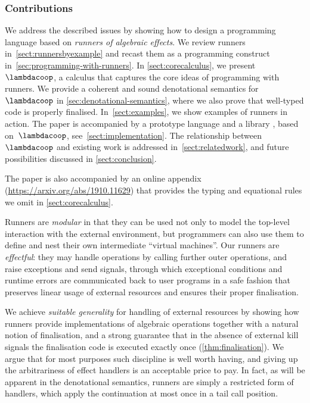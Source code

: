 \subsubsection*{Contributions}

We address the described issues by showing how to design a programming
language based on \emph{runners of algebraic effects}. We
review runners in~\cref{sect:runnersbyexample} and recast them as
a programming construct in~\cref{sec:programming-with-runners}.
%
In \cref{sect:corecalculus}, we present $\lambdacoop$, a calculus that captures the core ideas of programming with
runners. 
%
We provide a coherent and sound denotational semantics for $\lambdacoop$ in \cref{sec:denotational-semantics}, where we also prove that well-typed code is properly finalised.
%
In~\cref{sect:examples}, we show examples of runners in action. The paper is accompanied by a
prototype language  and a  library , based on~$\lambdacoop$, see~\cref{sect:implementation}. The relationship between $\lambdacoop$ and existing work is addressed in~\cref{sect:relatedwork}, and future possibilities discussed in \cref{sect:conclusion}.

The paper is also accompanied by an online appendix (\url{https://arxiv.org/abs/1910.11629}) that provides the typing and equational rules we omit in \cref{sect:corecalculus}.



Runners are \emph{modular} in that they
can be used not only to model the top-level interaction
with the external environment, but programmers can also use them to
define and nest their own intermediate ``virtual machines''.
Our runners are \emph{effectful}: they may handle operations by calling further outer operations, and raise exceptions and send signals, through which  exceptional conditions and runtime errors are communicated back to user programs in a safe
fashion that preserves linear usage of external resources and ensures their proper finalisation.

We achieve \emph{suitable generality} for handling of external resources by
showing how runners provide implementations of algebraic operations together with
a natural notion of finalisation, and a strong guarantee that in the absence of
external kill signals the finalisation code is executed exactly once (\cref{thm:finalisation}). We argue
that for most purposes such discipline is well worth having, and giving up the
arbitrariness of effect handlers is an acceptable price to pay.
%
In fact, as will be apparent in the denotational semantics, runners are simply
a restricted form of handlers, which apply the continuation at most once in a tail call position.

